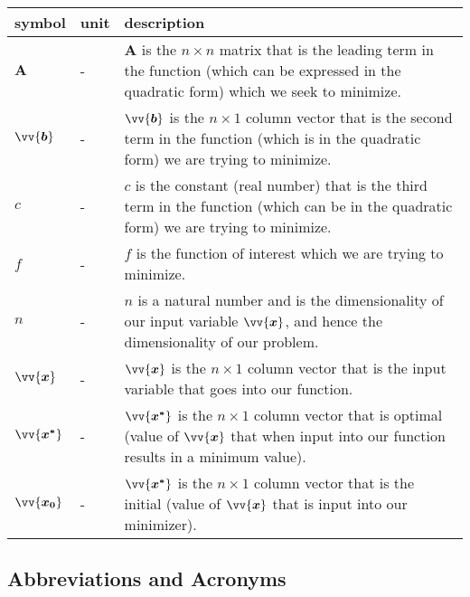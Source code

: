 \documentclass[12pt]{article}
\begin{document}
\renewcommand{\arraystretch}{1.2}
\noindent \begin{longtable*}{l l p{12cm}} \toprule
\textbf{symbol} & \textbf{unit} & \textbf{description}\\
\midrule 
$\mathbf{A}$ & \si[per-mode=symbol] {-} & $\mathbf{A}$ is the $n \times n$ matrix that is the leading term in the function (which can be expressed in the quadratic form) which we seek to minimize.
\\
$\vv{\bm{b}}$ & \si[per-mode=symbol] {-} & $\vv{\bm{b}}$ is the $n \times 1$ column vector that is the second term in the function (which is in the quadratic form) we are trying to minimize. 
\\ 
$c$ & \si[per-mode=symbol] {-} & $c$ is the constant (real number) that is the third term in the function (which can be in the quadratic form) we are trying to minimize.
\\
$f$ & \si[per-mode=symbol] {-} & $f$ is the function of interest which we are trying to minimize.  
\\
$n$ & \si[per-mode=symbol] {-} & $n$ is a natural number and is the dimensionality of our input variable $\vv{\bm{x}}$, and hence the dimensionality of our problem. 
\\
$\vv{\bm{x}}$ & \si[per-mode=symbol] {-} & $\vv{\bm{x}}$ is the $n \times 1$ column vector that is the input variable that goes into our function.
\\
$\vv{\bm{x^*}}$ & \si[per-mode=symbol] {-} & $\vv{\bm{x^*}}$ is the $n \times 1$ column vector that is optimal (value of $\vv{\bm{x}}$ that when input into our function results in a minimum value).
\\
$\vv{\bm{x_0}}$ & \si[per-mode=symbol] {-} & $\vv{\bm{x^*}}$ is the $n \times 1$ column vector that is the initial (value of $\vv{\bm{x}}$ that is input into our minimizer).
\\
\bottomrule
\end{longtable*}

\subsection{Abbreviations and Acronyms}
\end{document}
